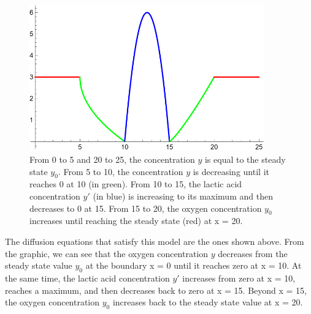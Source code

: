\documentclass{article}
\begin{document}
\begin{figure}[h!]
    \centering
    \includegraphics[width=0.9\textwidth]{graphics/image.png}
    \caption{From 0 to 5 and 20 to 25, the concentration $y$ is equal to the steady state $y_0$. From 5 to 10,
    the concentration $y$ is decreasing until it reaches 0 at 10 (in green). From 10 to 15, the lactic acid concentration
    $y'$ (in blue) is increasing to its maximum and then decreases to 0 at 15. From 15 to 20, the oxygen concentration $y_0$ increases
    until reaching the steady state (red) at x = 20.}
    \label{fig:image}
\end{figure}

The diffusion equations that satisfy this model are the ones shown above. From the graphic, we can see that the oxygen concentration $y$ decreases from the steady state value $y_0$ at the boundary x = 0 until it reaches zero at x = 10. At the same time, the lactic acid concentration $y'$ increases from zero at x = 10, reaches a maximum, and then decreases back to zero at x = 15. Beyond x = 15, the oxygen concentration $y_0$ increases back to the steady state value at x = 20.
\end{document}
